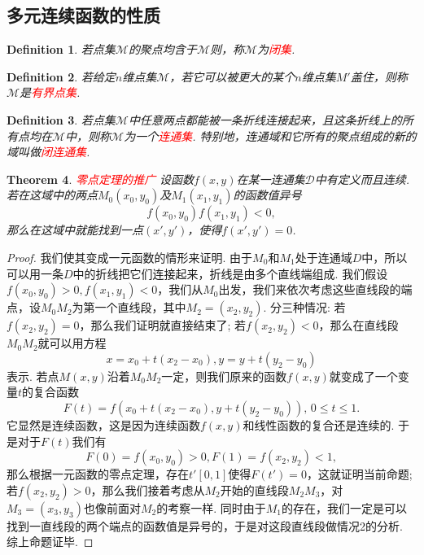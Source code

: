 \documentclass{article}
\newtheorem{theorem}{Theorem}[section]
\newtheorem{definition}[theorem]{Definition}
\newcommand{\redt}[1]{\textcolor{red}{#1}}
\begin{document}
\subsection{多元连续函数的性质}

\begin{definition}
\rm 若点集$\mathcal{M}$的聚点均含于$\mathcal{M}$则，称$\mathcal{M}$为\redt{闭集}.
\end{definition}

\begin{definition}
\rm 若给定$n$维点集$\mathcal{M}$，若它可以被更大的某个$n$维点集$M'$盖住，则称$\mathcal{M}$是\redt{有界点集}. 
\end{definition}

\begin{definition}
\rm 若点集$\mathcal{M}$中任意两点都能被一条折线连接起来，且这条折线上的所有点均在$\mathcal{M}$中，则称$\mathcal{M}$为一个\redt{连通集}. 特别地，连通域和它所有的聚点组成的新的域叫做\redt{闭连通集}.  
\end{definition}

\begin{theorem}
\rm \redt{零点定理的推广} 设函数$f(x,y)$在某一连通集$\mathcal{D}$中有定义而且连续. 若在这域中的两点$M_0(x_0,y_0)$及$M_1(x_1,y_1)$的函数值异号
$$
f(x_0,y_0)f(x_1,y_1) < 0,
$$
那么在这域中就能找到一点$(x',y')$，使得$f(x',y') = 0$.
\end{theorem}

\begin{proof}
我们使其变成一元函数的情形来证明. 由于$M_0$和$M_1$处于连通域$D$中，所以可以用一条$D$中的折线把它们连接起来，折线是由多个直线端组成. 我们假设$f(x_0,y_0) > 0,f(x_1,y_1) < 0$，我们从$M_0$出发，我们来依次考虑这些直线段的端点，设$M_0M_2$为第一个直线段，其中$M_2=(x_2,y_2)$. 分三种情况: 若$f(x_2,y_2) = 0$，那么我们证明就直接结束了; 若$f(x_2,y_2) < 0$，那么在直线段$M_0M_2$就可以用方程
$$
x = x_0  + t(x_2 - x_0), y = y + t(y_2-y_0)
$$
表示. 若点$M(x,y)$沿着$M_0M_2$一定，则我们原来的函数$f(x,y)$就变成了一个变量$t$的复合函数
$$
F(t) = f(x_0  + t(x_2 - x_0),y + t(y_2-y_0)), \, 0 \leq t \leq 1.
$$
它显然是连续函数，这是因为连续函数$f(x,y)$和线性函数的复合还是连续的. 于是对于$F(t)$我们有
$$
F(0) = f(x_0,y_0) > 0, F(1) = f(x_2,y_2) < 1,
$$
那么根据一元函数的零点定理，存在$t' [0,1]$使得$F(t') = 0$，这就证明当前命题; 若$f(x_2,y_2) > 0$，那么我们接着考虑从$M_2$开始的直线段$M_2M_3$，对$M_3=(x_3,y_3)$也像前面对$M_2$的考察一样. 同时由于$M_1$的存在，我们一定是可以找到一直线段的两个端点的函数值是异号的，于是对这段直线段做情况2的分析. 综上命题证毕.   
\end{proof}
\end{document}
